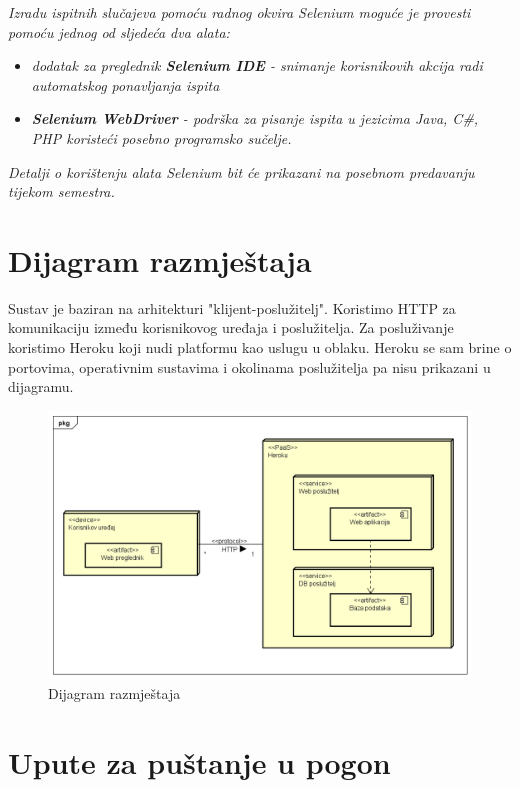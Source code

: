 {			 \textit{Izradu ispitnih slučajeva pomoću radnog okvira Selenium moguće je provesti pomoću jednog od sljedeća dva alata:}
			 \begin{itemize}
			 	\item \textit{dodatak za preglednik \textbf{Selenium IDE} - snimanje korisnikovih akcija radi automatskog ponavljanja ispita	}
			 	\item \textit{\textbf{Selenium WebDriver} - podrška za pisanje ispita u jezicima Java, C\#, PHP koristeći posebno programsko sučelje.}
			 \end{itemize}
		 	\textit{Detalji o korištenju alata Selenium bit će prikazani na posebnom predavanju tijekom semestra.}
			
			\eject 
		
		
		\section{Dijagram razmještaja}
			
			Sustav je baziran na arhitekturi "klijent-poslužitelj". Koristimo HTTP za komunikaciju između korisnikovog uređaja i poslužitelja. Za posluživanje koristimo Heroku koji nudi platformu kao uslugu u oblaku. Heroku se sam brine o portovima, operativnim sustavima i okolinama poslužitelja pa nisu prikazani u dijagramu.
			
			\begin{figure}[!h]
				\centering
				\includegraphics[width=1\linewidth]{slike/Dijagram_razmjestaja}
				\caption{Dijagram razmještaja}
				\label{fig:dijagramrazmjestaja}
			\end{figure}
			\eject
			
			\eject 
		
		\section{Upute za puštanje u pogon}
		
}
